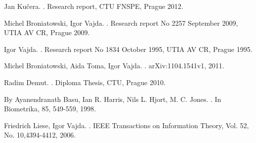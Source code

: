 {\begin{thebibliography}{10}
%

Jan Ku\v cera.
.
\newblock Research report, CTU FNSPE, Prague 2012.

Michel Broniatowski, Igor Vajda.
.
\newblock Research report No 2257 September 2009, UTIA AV CR, Prague 2009.

Igor Vajda.
.
\newblock Research report No 1834 October 1995, UTIA AV CR, Prague 1995.

Michel Broniatowski, Aida Toma, Igor Vajda.
.
\newblock arXiv:1104.1541v1, 2011.

Radim Demut.
.
\newblock Diploma Thesis, CTU, Prague 2010.

By Ayanendranath Basu, Ian R. Harris, Nils L. Hjort, M. C. Jones.
.
\newblock In Biometrika, 85, 549-559, 1998.

Friedrich Liese, Igor Vajda.
.
\newblock IEEE Transactions on Information Theory, Vol. 52, No. 10,4394-4412, 2006.


\end{thebibliography}
























































}
